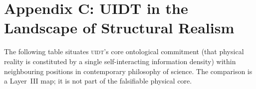 \documentclass[12pt,a4paper,twoside]{article}
\theoremstyle{plain}
\theoremstyle{definition}
\theoremstyle{remark}
\newcommand{\UIDT}{\textsc{uidt}}
\begin{document}



\section*{Appendix C: UIDT in the Landscape of Structural Realism}
\label{app:phil-comparison}

The following table situates \UIDT's core ontological commitment (that physical
reality is constituted by a single self-interacting information density) within
neighbouring positions in contemporary philosophy of science. The comparison is
a Layer~III map; it is not part of the falsifiable physical core.
\end{document}
